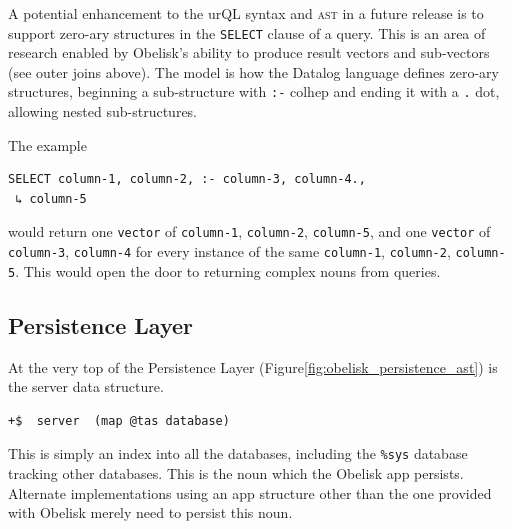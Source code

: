 \documentclass[twoside]{article}
\begin{document}
A potential enhancement to the urQL syntax and \textsc{ast} in a future release is to support zero-ary structures in the \lstinline[style=inlinecode]{SELECT} clause of a query. This is an area of research enabled by Obelisk's ability to produce result vectors and sub-vectors (see outer joins above). The model is how the Datalog language defines zero-ary structures, beginning a sub-structure with \lstinline[style=inlinecode]{:-} colhep and ending it with a \lstinline[style=inlinecode]{.} dot, allowing nested sub-structures.

The example

\begin{lstlisting}[style=listingcode_sql]
SELECT column-1, column-2, :- column-3, column-4.,
 ↳ column-5
\end{lstlisting}
\noindent
would return one \lstinline[style=inlinecode]{vector} of \lstinline[style=inlinecode]{column-1}, \lstinline[style=inlinecode]{column-2}, \lstinline[style=inlinecode]{column-5}, and one \lstinline[style=inlinecode]{vector} of \lstinline[style=inlinecode]{column-3}, \lstinline[style=inlinecode]{column-4} for every instance of the same \lstinline[style=inlinecode]{column-1}, \lstinline[style=inlinecode]{column-2}, \lstinline[style=inlinecode]{column-5}. This would open the door to returning complex nouns from queries.

\subsection{Persistence Layer}

At the very top of the Persistence Layer (Figure\ref{fig:obelisk_persistence_ast}) is the server data structure.

\begin{lstlisting}[style=listingblock, label={lst:obelisk_persistence}]
+$  server  (map @tas database)
\end{lstlisting}

\noindent
This is simply an index into all the databases, including the \lstinline[style=inlinecode]{%sys} database tracking other databases. This is the noun which the Obelisk app persists. Alternate implementations using an app structure other than the one provided with Obelisk merely need to persist this noun.
\end{document}
